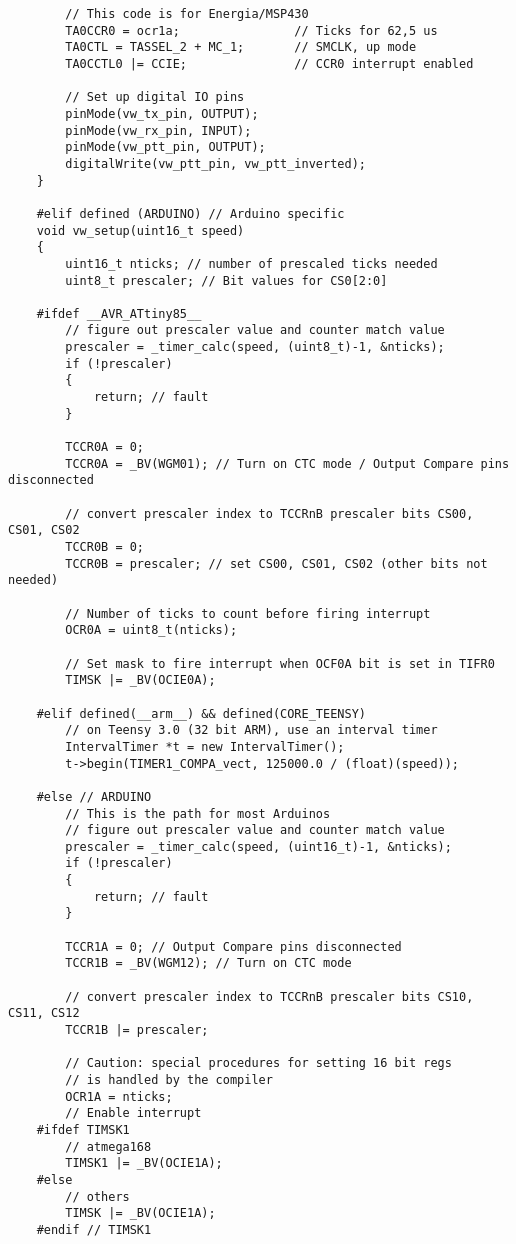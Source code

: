 \begin{verbatim}
        // This code is for Energia/MSP430
        TA0CCR0 = ocr1a;				// Ticks for 62,5 us
        TA0CTL = TASSEL_2 + MC_1;       // SMCLK, up mode
        TA0CCTL0 |= CCIE;               // CCR0 interrupt enabled
            
        // Set up digital IO pins
        pinMode(vw_tx_pin, OUTPUT);
        pinMode(vw_rx_pin, INPUT);
        pinMode(vw_ptt_pin, OUTPUT);
        digitalWrite(vw_ptt_pin, vw_ptt_inverted);
    }	

    #elif defined (ARDUINO) // Arduino specific
    void vw_setup(uint16_t speed)
    {
        uint16_t nticks; // number of prescaled ticks needed
        uint8_t prescaler; // Bit values for CS0[2:0]

    #ifdef __AVR_ATtiny85__
        // figure out prescaler value and counter match value
        prescaler = _timer_calc(speed, (uint8_t)-1, &nticks);
        if (!prescaler)
        {
            return; // fault
        }

        TCCR0A = 0;
        TCCR0A = _BV(WGM01); // Turn on CTC mode / Output Compare pins disconnected

        // convert prescaler index to TCCRnB prescaler bits CS00, CS01, CS02
        TCCR0B = 0;
        TCCR0B = prescaler; // set CS00, CS01, CS02 (other bits not needed)

        // Number of ticks to count before firing interrupt
        OCR0A = uint8_t(nticks);

        // Set mask to fire interrupt when OCF0A bit is set in TIFR0
        TIMSK |= _BV(OCIE0A);

    #elif defined(__arm__) && defined(CORE_TEENSY)
        // on Teensy 3.0 (32 bit ARM), use an interval timer
        IntervalTimer *t = new IntervalTimer();
        t->begin(TIMER1_COMPA_vect, 125000.0 / (float)(speed));

    #else // ARDUINO
        // This is the path for most Arduinos
        // figure out prescaler value and counter match value
        prescaler = _timer_calc(speed, (uint16_t)-1, &nticks);
        if (!prescaler)
        {
            return; // fault
        }

        TCCR1A = 0; // Output Compare pins disconnected
        TCCR1B = _BV(WGM12); // Turn on CTC mode

        // convert prescaler index to TCCRnB prescaler bits CS10, CS11, CS12
        TCCR1B |= prescaler;

        // Caution: special procedures for setting 16 bit regs
        // is handled by the compiler
        OCR1A = nticks;
        // Enable interrupt
    #ifdef TIMSK1
        // atmega168
        TIMSK1 |= _BV(OCIE1A);
    #else
        // others
        TIMSK |= _BV(OCIE1A);
    #endif // TIMSK1


\end{verbatim}
